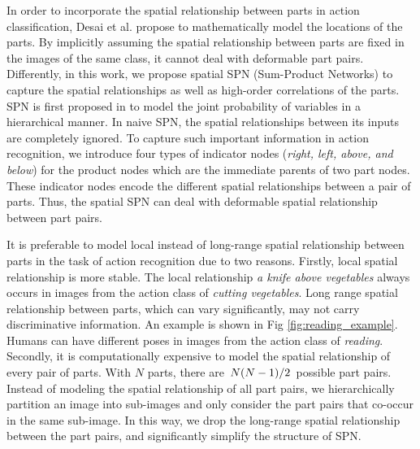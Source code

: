 \documentclass[journal]{IEEEtran}
\begin{document}

In order to incorporate the spatial relationship between parts in action classification, Desai et al. \cite{desai10_action} propose to mathematically model the locations of the parts. By implicitly assuming the spatial relationship between parts are fixed in the images of the same class, it cannot deal with deformable part pairs.
Differently, in this work, we propose spatial SPN (Sum-Product Networks) to capture the spatial relationships as well as high-order correlations of the parts.
SPN is first proposed in \cite{poon2011SPNIntroduce} to model the joint probability of variables in a hierarchical manner. In naive SPN, the spatial relationships between its inputs are completely ignored. To capture such important information in action recognition, we introduce four types of indicator nodes (\textit{right, left, above, and below}) for the product nodes which are the immediate parents of two part nodes. These indicator nodes encode the different spatial relationships between a pair of parts. Thus, the spatial SPN can deal with deformable spatial relationship between part pairs.





\newcommand{\slfrac}[2]{\left.#1\middle/#2\right.}

It is preferable to model local instead of long-range spatial relationship between parts in the task of action recognition due to two reasons.
Firstly, local spatial relationship is more stable. The local relationship \textit{a knife above vegetables} always occurs in images from the action class of \textit{cutting vegetables}. Long range spatial relationship between parts, which can vary significantly, may not carry discriminative information. An example is shown in Fig \ref{fig:reading_example}. Humans can have different poses in images from the action class of \textit{reading}.
Secondly, it is computationally expensive to model the spatial relationship of every pair of parts.
With $ N $ parts, there are $\slfrac{N(N-1)}{2} $ possible part pairs. Instead of modeling the spatial relationship of all part pairs, we hierarchically partition an image into sub-images and only consider the part pairs that co-occur in the same sub-image. In this way, we drop the long-range spatial relationship between the part pairs, and significantly simplify the structure of SPN.
\end{document}
